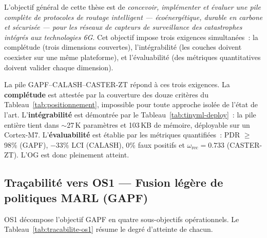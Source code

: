 L'objectif général de cette thèse est de \emph{concevoir, implémenter et évaluer une pile complète de protocoles de routage intelligent --- écoénergétique, durable en carbone et sécurisée --- pour les réseaux de capteurs de surveillance des catastrophes intégrés aux technologies 6G}. Cet objectif impose trois exigences simultanées~: la complétude (trois dimensions couvertes), l'intégrabilité (les couches doivent coexister sur une même plateforme), et l'évaluabilité (des métriques quantitatives doivent valider chaque dimension).

La pile GAPF--CALASH--CASTER-ZT répond à ces trois exigences. La \textbf{complétude} est attestée par la couverture des douze critères du Tableau~\ref{tab:positionnement}, impossible pour toute approche isolée de l'état de l'art. L'\textbf{intégrabilité} est démontrée par le Tableau~\ref{tab:tinyml-deploy}~: la pile entière tient dans $\sim$27\,K paramètres et 103\,KB de mémoire, déployable sur un Cortex-M7. L'\textbf{évaluabilité} est établie par les métriques quantifiées~: PDR $\geq$ 98\% (GAPF), $-33\%$ LCI (CALASH), 0\% faux positifs et $\omega_{\text{rec}} = 0.733$ (CASTER-ZT). L'OG est donc pleinement atteint.

\subsection{Traçabilité vers OS1 --- Fusion légère de politiques MARL (GAPF)}

OS1 décompose l'objectif GAPF en quatre sous-objectifs opérationnels. Le Tableau~\ref{tab:tracabilite-os1} résume le degré d'atteinte de chacun.

\begin{table}[htbp]
\centering
\caption{Traçabilité des résultats GAPF vers les sous-objectifs OS1.}
\label{tab:tracabilite-os1}
\end{table}

